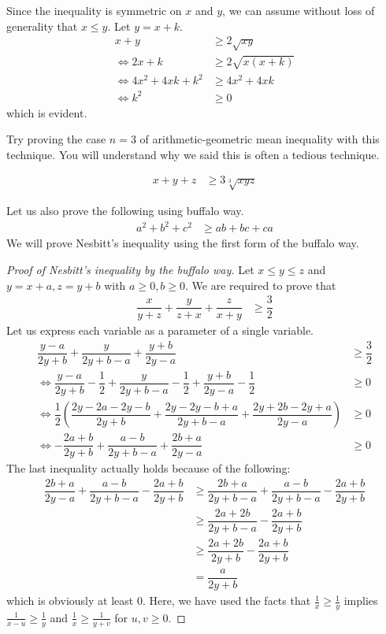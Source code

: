 \documentclass{subfile}
\begin{document}
		\begin{solution}
			Since the inequality is symmetric on $x$ and $y$, we can assume without loss of generality that $x\leq y$. Let $y=x+k$.
				\begin{align*}
					x+y
						& \geq2\sqrt{xy}\\
					\iff2x+k
						& \geq2\sqrt{x(x+k)}\\
					\iff4x^2+4xk+k^2
						& \geq4x^2+4xk\\
					\iff k^2
						& \geq0
				\end{align*}
			which is evident.
		\end{solution}
	Try proving the case $n=3$ of arithmetic-geometric mean inequality with this technique. You will understand why we said this is often a tedious technique.
		\begin{problem}
			\begin{align*}
				x+y+z
					& \geq3\sqrt[3]{xyz}
			\end{align*}
		\end{problem}
	Let us also prove the following using buffalo way.
		\begin{align*}
			a^2+b^2+c^2
				& \geq ab+bc+ca
		\end{align*}
	We will prove Nesbitt's inequality using the first form of the buffalo way.
		\begin{proof}[Proof of Nesbitt's inequality by the buffalo way]
			Let $x\leq y\leq z$ and $y=x+a,z=y+b$ with $a\geq0,b\geq0$. We are required to prove that
				\begin{align*}
					\dfrac{x}{y+z}+\dfrac{y}{z+x}+\dfrac{z}{x+y}
						& \geq\dfrac{3}{2}
				\end{align*}
			Let us express each variable as a parameter of a single variable.
				\begin{align*}
					\dfrac{y-a}{2y+b}+\dfrac{y}{2y+b-a}+\dfrac{y+b}{2y-a}
						& \geq\dfrac{3}{2}\\
					\iff\dfrac{y-a}{2y+b}-\dfrac{1}{2}+\dfrac{y}{2y+b-a}-\dfrac{1}{2}+\dfrac{y+b}{2y-a}-\dfrac{1}{2}
						& \geq0\\
					\iff\dfrac{1}{2}\left(\dfrac{2y-2a-2y-b}{2y+b}+\dfrac{2y-2y-b+a}{2y+b-a}+\dfrac{2y+2b-2y+a}{2y-a}\right)
						& \geq0\\
					\iff-\dfrac{2a+b}{2y+b}+\dfrac{a-b}{2y+b-a}+\dfrac{2b+a}{2y-a}
						& \geq0
				\end{align*}
			The last inequality actually holds because of the following:
				\begin{align*}
					\dfrac{2b+a}{2y-a}+\dfrac{a-b}{2y+b-a}-\dfrac{2a+b}{2y+b}
						& \geq\dfrac{2b+a}{2y+b-a}+\dfrac{a-b}{2y+b-a}-\dfrac{2a+b}{2y+b}\\
						& \geq\dfrac{2a+2b}{2y+b-a}-\dfrac{2a+b}{2y+b}\\
						& \geq\dfrac{2a+2b}{2y+b}-\dfrac{2a+b}{2y+b}\\
						& = \dfrac{a}{2y+b}
				\end{align*}
			which is obviously at least $0$. Here, we have used the facts that $\frac{1}{x}\geq\frac{1}{y}$ implies $\frac{1}{x-u}\geq\frac{1}{y}$ and $\frac{1}{x}\geq\frac{1}{y+v}$ for $u,v\geq0$.
		\end{proof}
\end{document}
